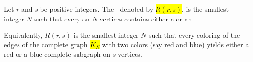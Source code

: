 \begin{definition} \label{definition:two_color_ramsey_number}
Let $r$ and $s$ be positive integers. The , denoted by \hl{$R(r,s)$}, is the smallest integer $N$ such that every  on $N$ vertices contains either a  or an .

Equivalently, $R(r,s)$ is the smallest integer $N$ such that every coloring of the edges of the complete graph \hl{$K_N$} with two colors (say red and blue) yields either a red  or a blue complete subgraph on $s$ vertices.
\end{definition}
